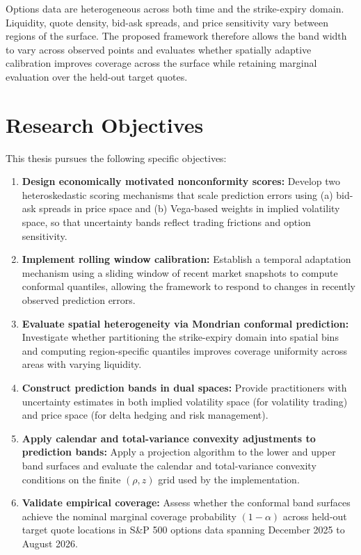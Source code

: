 Options data are heterogeneous across both time and the strike-expiry domain. Liquidity, quote density, bid-ask spreads, and price sensitivity vary between regions of the surface. The proposed framework therefore allows the band width to vary across observed points and evaluates whether spatially adaptive calibration improves coverage across the surface while retaining marginal evaluation over the held-out target quotes.

\section{Research Objectives}
\label{sec:objectives}

This thesis pursues the following specific objectives:

\begin{enumerate}
    \item \textbf{Design economically motivated nonconformity scores:} Develop two heteroskedastic scoring mechanisms that scale prediction errors using (a) bid-ask spreads in price space and (b) Vega-based weights in implied volatility space, so that uncertainty bands reflect trading frictions and option sensitivity.

    \item \textbf{Implement rolling window calibration:} Establish a temporal adaptation mechanism using a sliding window of recent market snapshots to compute conformal quantiles, allowing the framework to respond to changes in recently observed prediction errors.

    \item \textbf{Evaluate spatial heterogeneity via Mondrian conformal prediction:} Investigate whether partitioning the strike-expiry domain into spatial bins and computing region-specific quantiles improves coverage uniformity across areas with varying liquidity.

    \item \textbf{Construct prediction bands in dual spaces:} Provide practitioners with uncertainty estimates in both implied volatility space (for volatility trading) and price space (for delta hedging and risk management).

    \item \textbf{Apply calendar and total-variance convexity adjustments to prediction bands:} Apply a projection algorithm to the lower and upper band surfaces and evaluate the calendar and total-variance convexity conditions on the finite $(\rho,z)$ grid used by the implementation.

    \item \textbf{Validate empirical coverage:} Assess whether the conformal band surfaces achieve the nominal marginal coverage probability $(1 - \alpha)$ across held-out target quote locations in S\&P 500 options data spanning December 2025 to August 2026.
\end{enumerate}


